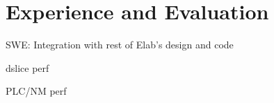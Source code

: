 
\section{Experience and Evaluation}
\label{experience}
\label{eval}


	SWE:
		Integration with rest of Elab's design and code

	dslice perf

	PLC/NM perf

